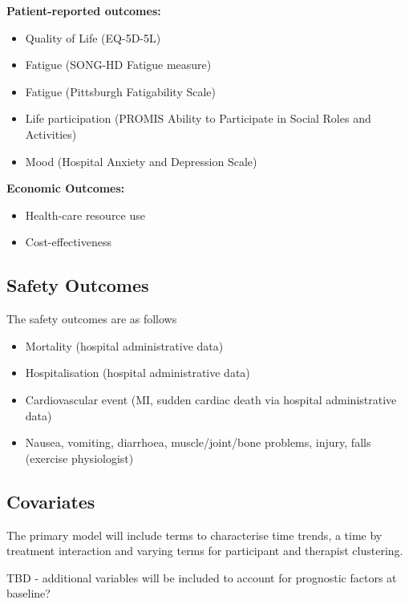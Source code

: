 \documentclass[
]{article}
\begin{document}
\textbf{Patient-reported outcomes:}
\begin{itemize}
    \item Quality of Life (EQ-5D-5L)
    \item Fatigue (SONG-HD Fatigue measure)
    \item Fatigue (Pittsburgh Fatigability Scale)
    \item Life participation (PROMIS Ability to Participate in Social Roles and Activities)
    \item Mood (Hospital Anxiety and Depression Scale)
\end{itemize}

\textbf{Economic Outcomes:}
\begin{itemize}
    \item Health-care resource use
    \item Cost-effectiveness
\end{itemize}

\hypertarget{safety-outcomes}{%
\subsection{Safety Outcomes}\label{safety-outcomes}}

The safety outcomes are as follows

\begin{itemize}
    \item Mortality (hospital administrative data)
    \item Hospitalisation (hospital administrative data)
    \item Cardiovascular event (MI, sudden cardiac death via hospital administrative data)
    \item Nausea, vomiting, diarrhoea, muscle/joint/bone problems, injury, falls (exercise physiologist)
\end{itemize}

\hypertarget{covariates}{%
\subsection{Covariates}\label{covariates}}

The primary model will include terms to characterise time trends, a time by treatment interaction and varying terms for participant and therapist clustering.

TBD - additional variables will be included to account for prognostic factors at baseline?

\clearpage
\end{document}
